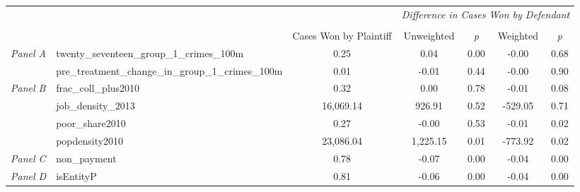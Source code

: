 \begin{tabular}{llccccc}
\toprule
 &  & \textit{} & \multicolumn{4}{c}{\textit{Difference in Cases Won by Defendant}} \\
\cline{4-7}
\\
 &  & Cases Won by Plaintiff & Unweighted & \emph{p} & Weighted & \emph{p} \\
\midrule
\multirow[c]{2}{3cm}{\textit{Panel A}} & twenty_seventeen_group_1_crimes_100m & 0.25 & 0.04 & 0.00 & -0.00 & 0.68 \\
 & pre_treatment_change_in_group_1_crimes_100m & 0.01 & -0.01 & 0.44 & -0.00 & 0.90 \\
\cline{1-7}
\multirow[c]{4}{3cm}{\textit{Panel B}} & frac_coll_plus2010 & 0.32 & 0.00 & 0.78 & -0.01 & 0.08 \\
 & job_density_2013 & 16,069.14 & 926.91 & 0.52 & -529.05 & 0.71 \\
 & poor_share2010 & 0.27 & -0.00 & 0.53 & -0.01 & 0.02 \\
 & popdensity2010 & 23,086.04 & 1,225.15 & 0.01 & -773.92 & 0.02 \\
\cline{1-7}
\textit{Panel C} & non_payment & 0.78 & -0.07 & 0.00 & -0.04 & 0.00 \\
\cline{1-7}
\textit{Panel D} & isEntityP & 0.81 & -0.06 & 0.00 & -0.04 & 0.00 \\
\cline{1-7}
\bottomrule
\end{tabular}
